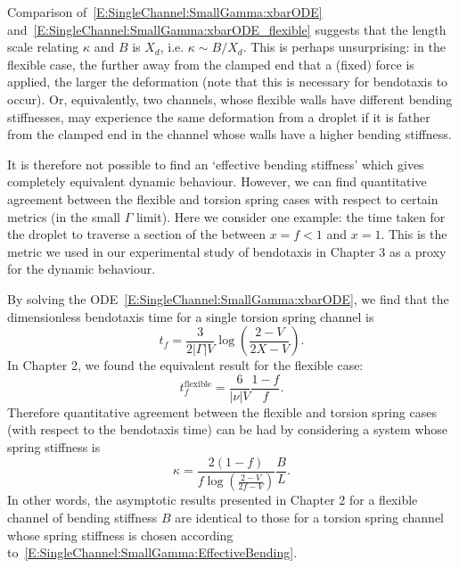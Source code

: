 Comparison of~\eqref{E:SingleChannel:SmallGamma:xbarODE} and~\eqref{E:SingleChannel:SmallGamma:xbarODE_flexible} suggests that the length scale relating $\kappa$ and $B$ is $X_d$, i.e. $\kappa \sim B/X_d$. This is perhaps unsurprising: in the flexible case, the further away from the clamped end that a (fixed) force is applied, the larger the deformation (note that this is necessary for bendotaxis to occur). Or, equivalently, two channels, whose flexible walls have different bending stiffnesses, may experience the same deformation from a droplet if it is father from the clamped end in the channel whose walls have a higher bending stiffness.

It is therefore not possible to find an `effective bending stiffness' which gives completely equivalent dynamic behaviour. However, we can find quantitative agreement between the flexible and torsion spring cases with respect to certain metrics (in the small $\Gamma$ limit). Here we consider one example: the time taken for the droplet to traverse a section of the between $x = f < 1$ and $x = 1$. This is the metric we used in our experimental study of bendotaxis in Chapter 3 as a proxy for the dynamic behaviour.

By solving the ODE~\eqref{E:SingleChannel:SmallGamma:xbarODE}, we find that the dimensionless bendotaxis time for a single torsion spring channel is
\begin{equation}\label{E:SingleChannel:SmallGamma:tX}
t_{f} = \frac{3}{2|\Gamma|V}\log\left(\frac{2-V}{2X-V}\right).
\end{equation}
In Chapter 2, we found the equivalent result for the flexible case:
\begin{equation}
t_{f}^{\text{flexible}} = \frac{6}{|\nu|V}\frac{1-f}{f}.
\end{equation}
Therefore quantitative agreement between the flexible and torsion spring cases (with respect to the bendotaxis time) can be had by considering a system whose spring stiffness is
\begin{equation}\label{E:SingleChannel:SmallGamma:EffectiveBending}
\kappa = \frac{2(1-f)}{f \log\left(\frac{2-V}{2f-V}\right)}\frac{B}{L}.
\end{equation}
In other words, the asymptotic results presented in Chapter 2 for a flexible channel of bending stiffness $B$ are identical to those for a torsion spring channel whose spring stiffness is chosen according to~\eqref{E:SingleChannel:SmallGamma:EffectiveBending}.



